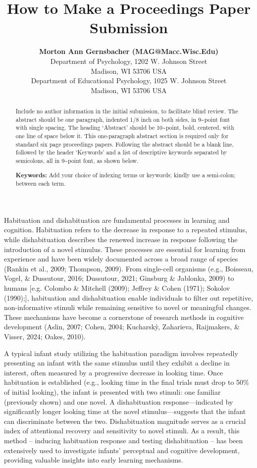 \documentclass[10pt, letterpaper]{article}
\title{How to Make a Proceedings Paper Submission}
\author{{\large \bf Morton Ann Gernsbacher (MAG@Macc.Wisc.Edu)} \\ Department of Psychology, 1202 W. Johnson Street \\ Madison, WI 53706 USA \AND {\large \bf Sharon J.~Derry (SDJ@Macc.Wisc.Edu)} \\ Department of Educational Psychology, 1025 W. Johnson Street \\ Madison, WI 53706 USA}
\begin{document}
\maketitle

\begin{abstract}
Include no author information in the initial submission, to facilitate
blind review. The abstract should be one paragraph, indented 1/8 inch on
both sides, in 9\textasciitilde point font with single spacing. The
heading `Abstract' should be 10\textasciitilde point, bold, centered,
with one line of space below it. This one-paragraph abstract section is
required only for standard six page proceedings papers. Following the
abstract should be a blank line, followed by the header `Keywords' and a
list of descriptive keywords separated by semicolons, all in
9\textasciitilde point font, as shown below.

\textbf{Keywords:}
Add your choice of indexing terms or keywords; kindly use a semi-colon;
between each term.
\end{abstract}

Habituation and dishabituation are fundamental processes in learning and
cognition. Habituation refers to the decrease in response to a repeated
stimulus, while dishabituation describes the renewed increase in
response following the introduction of a novel stimulus. These processes
are essential for learning from experience and have been widely
documented across a broad range of species (Rankin et al., 2009;
Thompson, 2009). From single-cell organisms (e.g., Boisseau, Vogel, \&
Dussutour, 2016; Dussutour, 2021; Ginsburg \& Jablonka, 2009) to humans
{[}e.g. Colombo \& Mitchell (2009); Jeffrey \& Cohen (1971); Sokolov
(1990);{]}, habituation and dishabituation enable individuals to filter
out repetitive, non-informative stimuli while remaining sensitive to
novel or meaningful changes. These mechanisms have become a cornerstone
of research methods in cognitive development (Aslin, 2007; Cohen, 2004;
Kucharskỳ, Zaharieva, Raijmakers, \& Visser, 2024; Oakes, 2010).

A typical infant study utilizing the habituation paradigm involves
repeatedly presenting an infant with the same stimulus until they
exhibit a decline in interest, often measured by a progressive decrease
in looking time. Once habituation is established (e.g., looking time in
the final trials must drop to 50\% of initial looking), the infant is
presented with two stimuli: one familiar (previously shown) and one
novel. A dishabituation response---indicated by significantly longer
looking time at the novel stimulus---suggests that the infant can
discriminate between the two. Dishabituation magnitude serves as a
crucial index of attentional recovery and sensitivity to novel stimuli.
As a result, this method -- inducing habituation response and testing
dishabituation -- has been extensively used to investigate infants'
perceptual and cognitive development, providing valuable insights into
early learning mechanisms.
\end{document}
